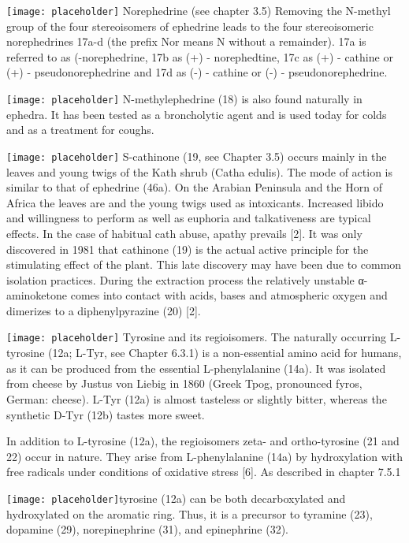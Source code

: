 \texttt{[image: placeholder]}
Norephedrine (see chapter 3.5) Removing the N-methyl group of the four stereoisomers of ephedrine leads to the four stereoisomeric norephedrines 17a-d (the prefix Nor means N without a remainder). 17a is referred to as (-norephedrine, 17b as (+) - norephedtine, 17c as (+) - cathine or (+) - pseudonorephedrine and 17d as (-) - cathine or (-) - pseudonorephedrine.

\texttt{[image: placeholder]}
N-methylephedrine (18) is also found naturally in ephedra. It has been tested as a broncholytic agent and is used today for colds and as a treatment for coughs.

\texttt{[image: placeholder]}
S-cathinone (19, see Chapter 3.5) occurs mainly in the leaves and young twigs of the Kath shrub (Catha edulis).
The mode of action is similar to that of ephedrine (46a). On the Arabian Peninsula and the Horn of Africa the leaves are
and the young twigs used as intoxicants. Increased libido and willingness to perform as well as euphoria and talkativeness are typical effects. In the case of habitual cath abuse, apathy prevails [2]. It was only discovered in 1981 that cathinone (19) is the actual active principle for the stimulating effect of the plant. This late discovery may have been due to common isolation practices. During the extraction process the relatively unstable α-aminoketone comes into contact with acids, bases and atmospheric oxygen and dimerizes to a diphenylpyrazine (20) [2].

\texttt{[image: placeholder]}
Tyrosine and its regioisomers. The naturally occurring L-tyrosine (12a; L-Tyr, see Chapter 6.3.1) is a non-essential amino acid for humans, as it can be produced from the essential L-phenylalanine (14a). It was isolated from cheese by Justus von Liebig in 1860 (Greek Tpog, pronounced fyros, German: cheese). L-Tyr (12a) is almost tasteless or slightly bitter, whereas the synthetic D-Tyr (12b) tastes more sweet.

In addition to L-tyrosine (12a), the regioisomers zeta- and ortho-tyrosine (21 and 22) occur in nature. They arise from L-phenylalanine (14a) by hydroxylation with free radicals under conditions of oxidative stress [6]. As described in chapter 7.5.1
\clearpage

\texttt{[image: placeholder]}tyrosine (12a) can be both decarboxylated and hydroxylated on the aromatic ring. Thus, it is a precursor to tyramine (23), dopamine (29), norepinephrine (31), and epinephrine (32).


